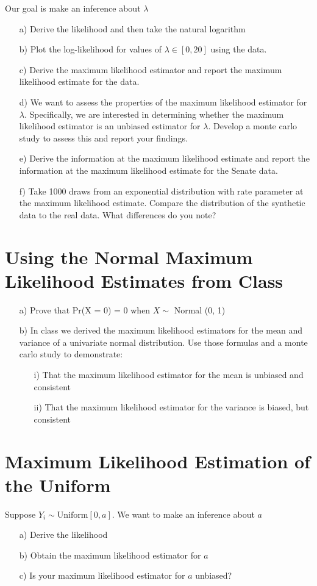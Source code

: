 \documentclass[letterpaper,12pt]{article}
\numberwithin{equation}{section}
\numberwithin{equation}{section}
\begin{document}
Our goal is make an inference about $\lambda$

\begin{itemize}
\item[a)] Derive the likelihood and then take the natural logarithm
\item[b)] Plot the log-likelihood for values of $\lambda \in [0, 20]$ using the data.
\item[c)] Derive the maximum likelihood estimator and report the maximum likelihood estimate for the data.
\item[d)] We want to assess the properties of the maximum likelihood estimator for $\lambda$.  Specifically, we are interested in determining whether the maximum likelihood estimator is an unbiased estimator for $\lambda$.  Develop a monte carlo study to assess this and report your findings.
\item[e)] Derive the information at the maximum likelihood estimate and report the information at the maximum likelihood estimate for the Senate data.
\item[f)] Take 1000 draws from an exponential distribution with rate parameter at the maximum likelihood estimate.  Compare the distribution of the synthetic data to the real data.  What differences do you note?
\end{itemize}


\section{Using the Normal Maximum Likelihood Estimates from Class}

\begin{itemize}
\item[a)] Prove that Pr(X = 0) = 0 when $X \sim$ Normal (0, 1)
\item[b)] In class we derived the maximum likelihood estimators for the mean and variance of a univariate normal distribution.  Use those formulas and a monte carlo study to demonstrate:
\begin{itemize}
\item[i)] That the maximum likelihood estimator for the mean is unbiased and consistent
\item[ii)] That the maximum likelihood estimator for the variance is biased, but consistent
\end{itemize}
\end{itemize}


\section{Maximum Likelihood Estimation of the Uniform}
Suppose $Y_{i} \sim \text{Uniform}[0, a]$.  We want to make an inference about $a$

\begin{itemize}
\item[a)] Derive the likelihood 
\item[b)] Obtain the maximum likelihood estimator for $a$
\item[c)] Is your maximum likelihood estimator for $a$ unbiased?
\end{itemize}
\end{document}
